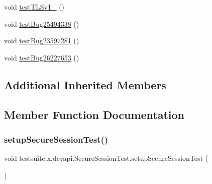 \begin{DoxyCompactItemize}
\item 
void \mbox{\hyperlink{classtestsuite_1_1x_1_1devapi_1_1_secure_session_test_a4bb7f7f9d1601519d8ff7ee0ec796360}{test\+T\+L\+Sv1\+\_}} ()
\item 
void \mbox{\hyperlink{classtestsuite_1_1x_1_1devapi_1_1_secure_session_test_afca505f06685ed0d91a8d30984491d6a}{test\+Bug25494338}} ()
\item 
void \mbox{\hyperlink{classtestsuite_1_1x_1_1devapi_1_1_secure_session_test_a30cc42accb4ad16995c0dd39d7e78c3b}{test\+Bug23597281}} ()
\item 
void \mbox{\hyperlink{classtestsuite_1_1x_1_1devapi_1_1_secure_session_test_a09acd3b7e647dbedb76f433a23d11b31}{test\+Bug26227653}} ()
\end{DoxyCompactItemize}
\subsection*{Additional Inherited Members}


\subsection{Member Function Documentation}
\mbox{\label{classtestsuite_1_1x_1_1devapi_1_1_secure_session_test_a531c9ad1af18dfd3fd69ac42d16c8763}} 
\subsubsection{\texorpdfstring{setup\+Secure\+Session\+Test()}{setupSecureSessionTest()}}
{\footnotesize\ttfamily void testsuite.\+x.\+devapi.\+Secure\+Session\+Test.\+setup\+Secure\+Session\+Test (\begin{DoxyParamCaption}{ }\end{DoxyParamCaption})}

\mbox{\label{classtestsuite_1_1x_1_1devapi_1_1_secure_session_test_a7d598e38db5228b2bd1d4e54ad13b8aa}} 
